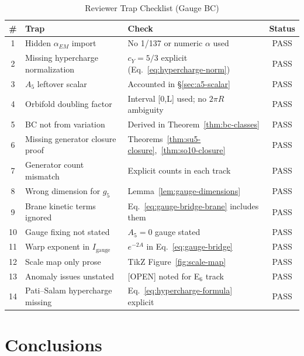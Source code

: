 \documentclass[11pt,a4paper]{article}
\begin{document}
\begin{table}[ht]
\centering
\caption{Reviewer Trap Checklist (Gauge BC)}
\label{tab:traps}
\small
\begin{tabular}{clp{5.5cm}c}
\toprule
\# & Trap & Check & Status \\
\midrule
1 & Hidden $\alpha_{EM}$ import & No 1/137 or numeric $\alpha$ used & PASS \\
2 & Missing hypercharge normalization & $c_Y = 5/3$ explicit (Eq.~\ref{eq:hypercharge-norm}) & PASS \\
3 & $A_5$ leftover scalar & Accounted in \S\ref{sec:a5-scalar} & PASS \\
4 & Orbifold doubling factor & Interval [0,L] used; no $2\pi R$ ambiguity & PASS \\
5 & BC not from variation & Derived in Theorem~\ref{thm:bc-classes} & PASS \\
6 & Missing generator closure proof & Theorems~\ref{thm:su5-closure},~\ref{thm:so10-closure} & PASS \\
7 & Generator count mismatch & Explicit counts in each track & PASS \\
8 & Wrong dimension for $g_5$ & Lemma~\ref{lem:gauge-dimensions} & PASS \\
9 & Brane kinetic terms ignored & Eq.~\ref{eq:gauge-bridge-brane} includes them & PASS \\
10 & Gauge fixing not stated & $A_5 = 0$ gauge stated & PASS \\
11 & Warp exponent in $I_{\text{gauge}}$ & $e^{-2A}$ in Eq.~\ref{eq:gauge-bridge} & PASS \\
12 & Scale map only prose & TikZ Figure~\ref{fig:scale-map} & PASS \\
13 & Anomaly issues unstated & [OPEN] noted for E$_6$ track & PASS \\
14 & Pati--Salam hypercharge missing & Eq.~\ref{eq:hypercharge-formula} explicit & PASS \\
\bottomrule
\end{tabular}
\end{table}

\section{Conclusions}
\label{sec:conclusions}
\end{document}
